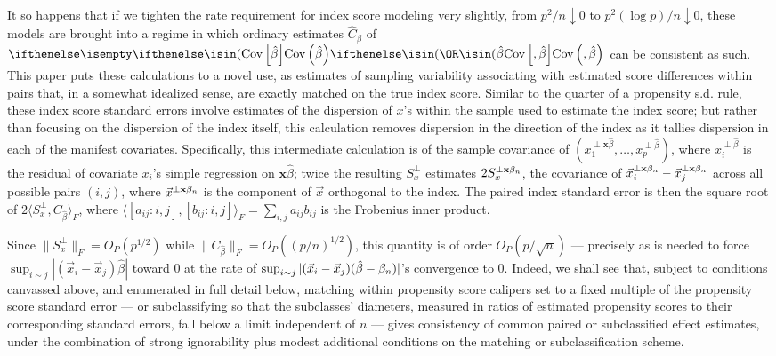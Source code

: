\documentclass{article}
\theoremstyle{remark}
\begin{document}
It so happens that if we tighten the rate requirement for index score
modeling very slightly, from $p^2/n \downarrow 0$ to
$p^2 (\log p)/n \downarrow 0$, these models are brought into a regime in
which ordinary estimates $\hat{C}_\beta$ of $\Cov{\hat\beta}$ can be consistent
as such. This paper puts these calculations to a novel use, as estimates
of sampling variability associating with estimated score differences
within pairs that, in a somewhat idealized sense, are exactly matched
on the true index score. Similar to the quarter of a propensity s.d.
rule, these index score standard errors involve estimates of the
dispersion of $x$'s within the sample used to estimate the index score;
but rather than focusing on the dispersion of the index itself, this
calculation removes 
dispersion in the direction of the index as it tallies dispersion in
each of the manifest covariates.  Specifically,  this intermediate calculation is of 
the sample covariance of
$(x_1^{\perp  \mathbf{x}\hat\beta}, \ldots, x_p^{\perp\hat\beta})$,
where $x_i^{\perp\hat\beta}$ is the residual of covariate $x_i$'s simple
regression on $\mathbf{x}\hat\beta$; twice the resulting 
$S_x^{\perp}$ estimates $2S_x^{\perp
\mathbf{x}\beta_{n }}$, the covariance of 
$\vec{x}_{i}^{\perp\mathbf{x}\beta_{n }} - \vec{x}_{j}^{\perp\mathbf{x}\beta_{n }}$
across all possible pairs $(i,j)$, where
$\vec{x}^{\perp\mathbf{x}\beta_{n }}$ is the component of $\vec{x}$
orthogonal to the index. 
The paired index standard error is then the square root of
$2 \langle S_{x}^\perp, C_{\hat{\beta}} \rangle_F$, where $\langle [a_{ij}:i,j],
[b_{ij}: i,j] \rangle_{F} = \sum_{i,j} a_{ij}b_{ij}$ is the Frobenius inner product.

Since $\|S_{x}^{\perp}\|_{F} = O_{P}(p^{1/2})$ while $\|C_{\hat\beta}\|_{F} = O_{P}((p/n)^{1/2})$, this quantity is of order
$O_{P}(p/\sqrt{n})$ ---  precisely as is needed to force $\sup_{i \sim j}
|(\vec{x}_{i} - \vec{x}_{j})\hat\beta|$ toward 0 at the
rate of $\sup_{i \sim j}
|(\vec{x}_{i} - \vec{x}_{j})(\hat\beta - \beta_{n })|$'s convergence to 0. Indeed, we shall see that,
subject to conditions canvassed above, and enumerated in full detail
below, matching within propensity score
calipers set to a fixed multiple of the propensity score standard
error --- or subclassifying so that the subclasses' diameters, measured in ratios
of estimated propensity scores to their corresponding standard errors,
fall below a limit independent of $n$ --- gives consistency of common
paired or subclassified effect estimates, under the combination of
strong ignorability \citep{rosenbaum:rubi:1983} plus modest additional conditions on the
matching or subclassification scheme.
\end{document}
